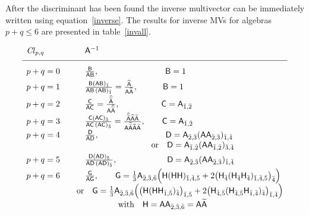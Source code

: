 \documentclass{birkjour}
\newcommand{\cl}[2]{\ensuremath{\mathit{Cl}_{#1,#2}}} %
\newcommand{\reverse}[1]{\widetilde{#1}}
\newcommand{\gradeinverse}[1]{\wideparen{#1}}
\newcommand{\cliffordconjugate}[1]{\wideparen{\widetilde{#1}}}
\def\m#1{\mathsf{#1}} %
\begin{document}
After  the discriminant has been found  the inverse multivector
can be immediately written using equation~\eqref{inverse}. The
results for inverse MVs for algebras $p+q\le 6$ are presented in
table~\ref{invall}.
\begin{table}
\[\begin{array}{ll}
\cl{p}{q}&\qquad  \m{A}^{-1} \\[5pt]\hline\\[-5pt]
p+q=0&\qquad\frac{\m{B}}{\m{A}\m{B}},\qquad\qquad\qquad\qquad\m{B}=1\\[4pt]
%
 p+q=1&\qquad
\frac{\m{B}(\m{A}\m{B})_{\bar{1}}}{\m{A}\m{B}\,(\m{A}\m{B})_{\bar{1}}}
= \frac{\gradeinverse{\m{A}}}{\m{A} \gradeinverse{\m{A}}},\quad\qquad\m{B}=1\\[4pt]
%
  p+q=2&\qquad \frac{\m{C}}{\m{A}\m{C}}=\frac{\cliffordconjugate{\m{A}}}{\m{A} \cliffordconjugate{\m{A}}}
,\qquad\qquad\quad\m{C}=\m{A}_{\bar{1},\bar{2}}\\[4pt]
%
  p+q=3 &\qquad
 \frac{\m{C}(\m{A}\m{C})_{\bar{3}}}{\m{A}\m{C}\,(\m{A}\m{C})_{\bar{3}}}
=\frac{\cliffordconjugate{\m{A}}\gradeinverse{\m{A}}\reverse{\m{A}}}{\m{A}
\cliffordconjugate{\m{A}}\gradeinverse{\m{A}}\reverse{\m{A}}}
,\qquad\m{C}=\m{A}_{\bar{1},\bar{2}}\\[4pt]
%
 p+q=4&\qquad\frac{\m{D}}{\m{A}\m{D}},\qquad\qquad\qquad\qquad
\m{D}=\m{A}_{\bar{2},\bar{3}}
(\m{A}\m{A}_{\bar{2},\bar{3}})_{\bar{1},\bar{4}}\quad \\
   &\qquad\qquad\qquad\qquad\qquad\textrm{or}\quad \m{D}=\m{A}_{\bar{1},\bar{2}}(\m{A}
\m{A}_{\bar{1},\bar{2}})_{\bar{3},\bar{4}}  \\[4pt]
%
 p+q=5&\qquad\frac{\m{D}(\m{A}\m{D})_{\bar{5}}}{\m{A}\m{D}\,
(\m{A}\m{D})_{\bar{5}}},\qquad\qquad\qquad
\m{D}=\m{A}_{\bar{2},\bar{3}}
(\m{A}\m{A}_{\bar{2},\bar{3}})_{\bar{1},\bar{4}}\\[4pt]
%
p+q=6&\qquad\frac{\m{G}}{\m{A}\m{G}},\qquad\m{G}=\frac{1}{3} \m{A}_{\bar{2},\bar{3},\bar{6}} \Bigl(\m{H} (\m{H} \m{H})_{\bar{1},\bar{4},\bar{5}} + 2 \bigl(\m{H}_{\bar{4}} (\m{H}_{\bar{4}} \m{H}_{\bar{4}})_{\bar{1},\bar{4},\bar{5}}\bigr)_{\bar{4}}\Bigr)\\
     &\quad\textrm{or}\quad \m{G}=\frac{1}{3} \m{A}_{\bar{2},\bar{3},\bar{6}} \Bigl(\bigl(\m{H} (\m{H} \m{H}_{\bar{1},\bar{5}})_{\bar{4}}\bigr)_{\bar{1},\bar{5}} + 2 \bigl(\m{H}_{\bar{4},\bar{5}} (\m{H}_{\bar{4},\bar{5}} \m{H}_{\bar{1},\bar{4}})_{\bar{4}}\bigr)_{\bar{1},\bar{4}}\Bigr)\\
&\qquad \qquad \qquad\textrm{with}\quad \m{H}=\m{A} \m{A}_{\bar{2},\bar{3},\bar{6}}=\m{A}\reverse{\m{A}}
\end{array}
\]
\caption{\label{invall}Summary of formulas for inverse
multivectors in a left-side form of initial MV  for Clifford
algebras of dimension $p+q\le 6$. In case $p+q=6$ the second more
complicated algorithm (formula) for computation of discriminant
$s_{8+8}=\m{A}\m{G}$ in orthonormal basis is faster.}
\end{table}
\end{document}
